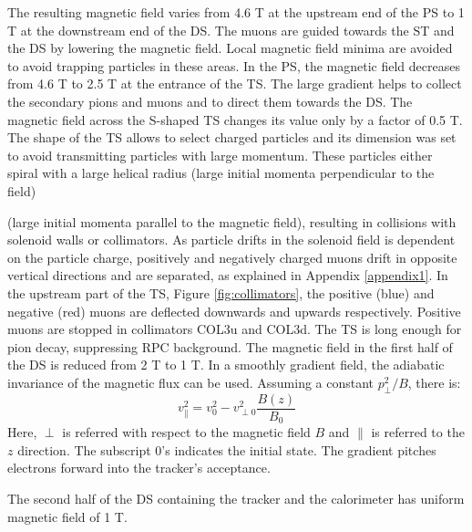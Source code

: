 The resulting magnetic field varies from 4.6 T at the upstream end of the PS 
to 1 T at the downstream end of the DS. 
The muons are guided towards the ST and the DS by lowering the magnetic field. 
Local magnetic field minima are avoided to avoid trapping particles in these areas. 
In the PS, the magnetic field decreases from 4.6 T to 2.5 T at the entrance of 
the TS. The large gradient helps to collect the secondary pions and muons and to 
direct them towards the DS. The magnetic field across the S-shaped TS changes its 
value only by a factor of 0.5 T. The shape of the TS allows to select charged particles 
and its dimension was set to avoid transmitting 
particles with large momentum. These particles either spiral with a large helical 
radius (large initial momenta perpendicular to the field) 

(large initial momenta parallel to the magnetic field), resulting 
in collisions with solenoid walls or collimators. As particle drifts in the solenoid field is dependent on the particle charge,  
positively and negatively charged muons 
drift in opposite vertical directions and are separated, as explained in Appendix 
\ref{appendix1}. In the upstream part of the TS, Figure 
\ref{fig:collimators}, the positive (blue) and negative (red) muons 
are deflected downwards and upwards respectively. Positive muons are stopped in 
collimators COL3u and COL3d. The TS is long enough for pion decay, suppressing 
 RPC background.
The magnetic field in the first half of 
the DS is reduced from 2 T to 1 T. In a smoothly gradient field, the adiabatic 
invariance of the magnetic flux can be used. Assuming a constant $p^2_\perp/B$, there is:
\begin{equation}
    v^2_{\parallel}=v^2_0-v^2_{\perp 0}\frac{B(z)}{B_0}
\end{equation}
Here, $\perp$ is referred with respect to the magnetic field $B$ and $\parallel$ is 
referred to the $z$ direction. The subscript 0's indicates the initial state. 
The gradient pitches electrons forward into the tracker's acceptance. 

The second half of the DS containing the tracker and the calorimeter has
uniform magnetic field of 1 T.

